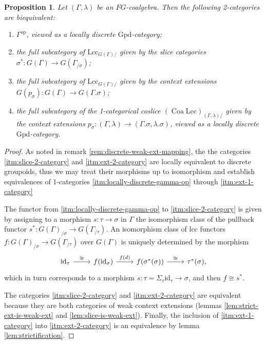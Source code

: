 \documentclass[a4paper]{article}
\newtheorem{proposition}[theorem]{Proposition}
\theoremstyle{remark}
\theoremstyle{definition}
\begin{document}
\begin{proposition}
  \label{prop:cats-of-weak-exts}
  Let $(\Gamma, \lambda)$ be an $FG$-coalgebra.
  Then the following 2-categories are biequivalent:
  \begin{enumerate}
    \item
      \label{itm:locally-discrete-gamma-op}
      $\Gamma^\mathrm{op}$, viewed as a locally discrete $\mathrm{Gpd}$-category;
    \item
      \label{itm:slice-2-category}
      the full subcategory of $\mathrm{Lcc}_{G(\Gamma) /}$ given by the slice categories $\sigma^* : G(\Gamma) \rightarrow G(\Gamma_{/ \sigma})$;
    \item
      \label{itm:ext-2-category}
      the full subcategory of $\mathrm{Lcc}_{G(\Gamma) /}$ given by the context extensions $G(p_\sigma) : G(\Gamma) \rightarrow G(\Gamma.\sigma)$;
    \item
      \label{itm:ext-1-category}
      the full subcategory of the 1-categorical coslice $(\operatorname{Coa} \mathrm{Lcc})_{(\Gamma, \lambda) /}$ given by the context extensions $p_\sigma : (\Gamma, \lambda) \rightarrow (\Gamma.\sigma, \lambda.\sigma)$, viewed as a locally discrete $\mathrm{Gpd}$-category.
  \end{enumerate}
\end{proposition}
\begin{proof}
  As noted in remark \ref{rem:discrete-weak-ext-mapping}, the the categories \ref{itm:slice-2-category} and \ref{itm:ext-2-category} are locally equivalent to discrete groupoids, thus we may treat their morphisms up to isomorphism and establish equivalences of 1-categories \ref{itm:locally-discrete-gamma-op} through \ref{itm:ext-1-category}

  The functor from \ref{itm:locally-discrete-gamma-op} to \ref{itm:slice-2-category} is given by assigning to a morphism $s : \tau \rightarrow \sigma$ in $\Gamma$ the isomorphism class of the pullback functor $s^* : G(\Gamma)_{/ \sigma} \rightarrow G(\Gamma_{/ \tau})$.
  An isomorphism class of lcc functors $f : G(\Gamma)_{/ \sigma} \rightarrow G(\Gamma_{/ \tau})$ over $G(\Gamma)$ is uniquely determined by the morphism
  \begin{equation}
    \begin{tikzcd}
      \mathrm{id}_\tau \arrow[r, "\cong"] & f(\mathrm{id}_\sigma) \arrow[r, "f(d)"] & f(\sigma^*(\sigma)) \arrow[r, "\cong"] & \tau^*(\sigma),
    \end{tikzcd}
  \end{equation}
  which in turn corresponds to a morphism $s : \tau = \Sigma_\tau \mathrm{id}_\tau \rightarrow \sigma$, and then $f \cong s^*$.

  The categories \ref{itm:slice-2-category} and \ref{itm:ext-2-category} are equivalent because they are both categories of weak context extensions (lemmas \ref{lem:strict-ext-is-weak-ext} and \ref{lem:slice-is-weak-ext}).
  Finally, the inclusion of \ref{itm:ext-1-category} into \ref{itm:ext-2-category} is an equivalence by lemma \ref{lem:strictification}.
\end{proof}
\end{document}
